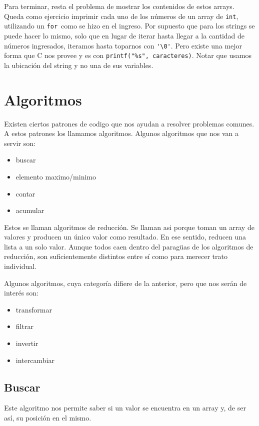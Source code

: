 \documentclass[10pt]{article}
\newcommand{\cfor}[0]{\lstinline{for}}
\begin{document}
\bigskip

Para terminar, resta el problema de mostrar los contenidos de estos arrays. Queda como ejercicio imprimir cada uno de los números de un array de \lstinline{int}, utilizando un \cfor\ como se hizo en el ingreso. Por supuesto que para los strings se puede hacer lo mismo, solo que en lugar de iterar hasta llegar a la cantidad de números ingresados, iteramos hasta toparnos con \lstinline{'\0'}. Pero existe una mejor forma que C nos provee y es con \lstinline{printf("%s", caracteres)}. Notar que usamos la ubicación del string y no una de sus variables.

\section{Algoritmos}

Existen ciertos patrones de codigo que nos ayudan a resolver problemas comunes. A estos patrones los llamamos algoritmos. Algunos algoritmos que nos van a servir son:

\begin{itemize}
	\item buscar
	\item elemento maximo/minimo
	\item contar
	\item acumular
\end{itemize}

Estos se llaman algoritmos de reducción. Se llaman asi porque toman un array de valores y producen un único valor como resultado. En ese sentido, reducen una lista a un solo valor. Aunque todos caen dentro del paragüas de los algoritmos de reducción, son suficientemente distintos entre sí como para merecer trato individual.

Algunos algoritmos, cuya categoría difiere de la anterior, pero que nos serán de interés son:

\begin{itemize}
	\item transformar
	\item filtrar
	\item invertir
	\item intercambiar
\end{itemize}

\subsection{Buscar}

Este algoritmo nos permite saber si un valor se encuentra en un array y, de ser así, su posición en el mismo.
\end{document}
